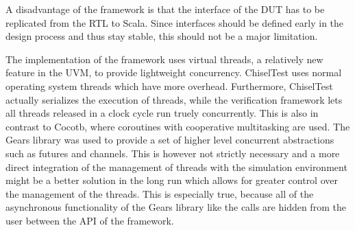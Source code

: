 A disadvantage of the framework is that the interface of the DUT has to be replicated from the RTL to Scala. Since interfaces should be defined early in the design process and thus stay stable, this should not be a major limitation.




The implementation of the framework uses virtual threads, a relatively new feature in the UVM, to provide lightweight concurrency. ChiselTest uses normal operating system threads which have more overhead. Furthermore, ChiselTest actually serializes the execution of threads, while the verification framework lets all threads released in a clock cycle run truely concurrently. This is also in contrast to Cocotb, where coroutines with cooperative multitasking are used. The Gears library was used to provide a set of higher level concurrent abstractions such as futures and channels. This is however not strictly necessary and a more direct integration of the management of threads with the simulation environment might be a better solution in the long run which allows for greater control over the management of the threads. This is especially true, because all of the asynchronous functionality of the Gears library like the  calls are hidden from the user between the API of the framework.

